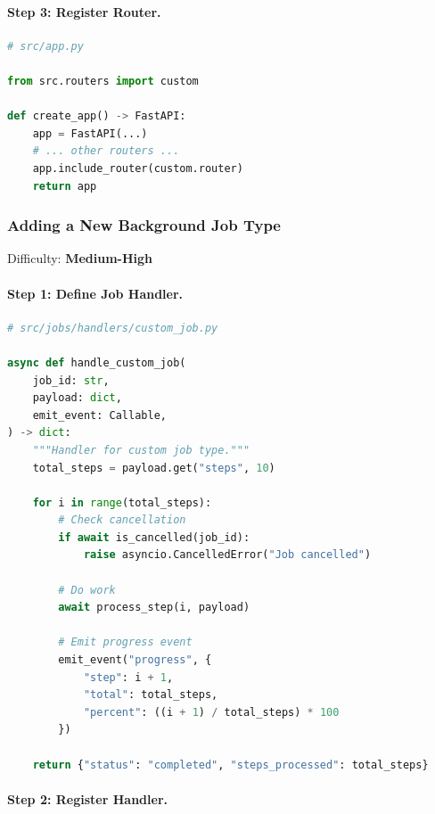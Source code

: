 \paragraph{Step 3: Register Router.}

\begin{lstlisting}[language=Python, caption={Registering router in app.py}, label={lst:register-router}]
# src/app.py

from src.routers import custom

def create_app() -> FastAPI:
    app = FastAPI(...)
    # ... other routers ...
    app.include_router(custom.router)
    return app
\end{lstlisting}

\subsubsection{Adding a New Background Job Type}

Difficulty: \textbf{Medium-High}

\paragraph{Step 1: Define Job Handler.}

\begin{lstlisting}[language=Python, caption={Background job handler}, label={lst:job-handler}]
# src/jobs/handlers/custom_job.py

async def handle_custom_job(
    job_id: str,
    payload: dict,
    emit_event: Callable,
) -> dict:
    """Handler for custom job type."""
    total_steps = payload.get("steps", 10)
    
    for i in range(total_steps):
        # Check cancellation
        if await is_cancelled(job_id):
            raise asyncio.CancelledError("Job cancelled")
        
        # Do work
        await process_step(i, payload)
        
        # Emit progress event
        emit_event("progress", {
            "step": i + 1,
            "total": total_steps,
            "percent": ((i + 1) / total_steps) * 100
        })
    
    return {"status": "completed", "steps_processed": total_steps}
\end{lstlisting}

\paragraph{Step 2: Register Handler.}

